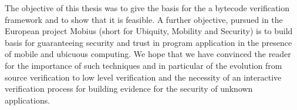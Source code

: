The objective of this thesis was to 
give the basis for the a bytecode verification framework and to show that it is feasible. A further objective, pursued in the European project
 Mobius (short for Ubiquity, Mobility and Security) 
is to build basis for guaranteeing security and trust in program application in the presence of mobile and ubicuous computing. We hope that we have convinced
the reader for the importance of such techniques and in particular of the evolution from source verification to
 low level verification  and the necessity of an interactive verification process for building evidence for the security of unknown applications. 
